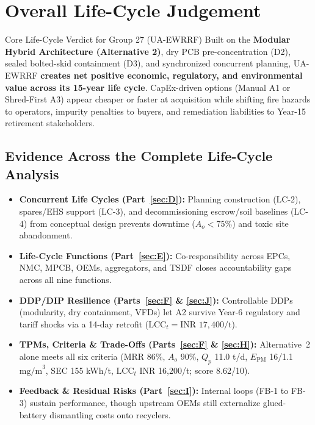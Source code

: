 \section{Overall Life-Cycle Judgement}
\label{sec:K}

\begin{keybox}{Core Life-Cycle Verdict for Group 27 (UA-EWRRF)}
Built on the \textbf{Modular Hybrid Architecture (Alternative 2)}, dry PCB pre-concentration (D2), sealed bolted-skid containment (D3), and synchronized concurrent planning, UA-EWRRF \textbf{creates net positive economic, regulatory, and environmental value across its 15-year life cycle}. CapEx-driven options (Manual A1 or Shred-First A3) appear cheaper or faster at acquisition while shifting fire hazards to operators, impurity penalties to buyers, and remediation liabilities to Year-15 retirement stakeholders.
\end{keybox}

\subsection{Evidence Across the Complete Life-Cycle Analysis}
\begin{itemize}
    \item \textbf{Concurrent Life Cycles (Part~\ref{sec:D}):} Planning construction (LC-2), spares/EHS support (LC-3), and decommissioning escrow/soil baselines (LC-4) from conceptual design prevents downtime ($A_o < 75\%$) and toxic site abandonment.
    \item \textbf{Life-Cycle Functions (Part~\ref{sec:E}):} Co-responsibility across EPCs, NMC, MPCB, OEMs, aggregators, and TSDF closes accountability gaps across all nine functions.
    \item \textbf{DDP/DIP Resilience (Parts~\ref{sec:F} \& \ref{sec:J}):} Controllable DDPs (modularity, dry containment, VFDs) let A2 survive Year-6 regulatory and tariff shocks via a 14-day retrofit ($\text{LCC}_t = \text{INR } 17{,}400/\text{t}$).
    \item \textbf{TPMs, Criteria \& Trade-Offs (Parts~\ref{sec:F} \& \ref{sec:H}):} Alternative~2 alone meets all six criteria (MRR 86\%, $A_o$ 90\%, $Q_p$ 11.0 t/d, $E_{\text{PM}}$ 16/1.1 $\text{mg/m}^3$, SEC 155 kWh/t, $\text{LCC}_t$ INR 16,200/t; score 8.62/10).
    \item \textbf{Feedback \& Residual Risks (Part~\ref{sec:I}):} Internal loops (FB-1 to FB-3) sustain performance, though upstream OEMs still externalize glued-battery dismantling costs onto recyclers.
\end{itemize}

